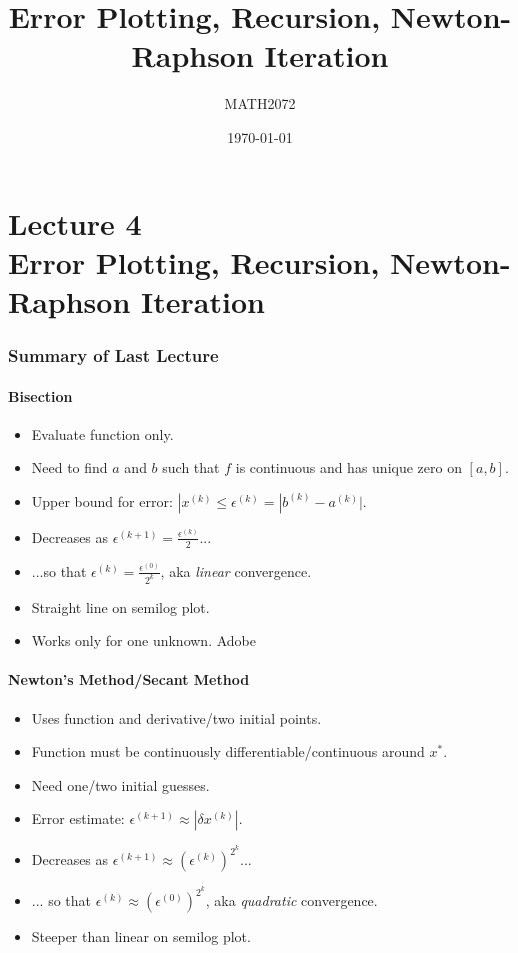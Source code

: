 \documentclass{article}
\title{Error Plotting, Recursion, Newton-Raphson Iteration}
\author{MATH2072}
\date{\today}
\begin{document}
\part*{Lecture 4\\Error Plotting, Recursion, Newton-Raphson Iteration}

\section*{Summary of Last Lecture}

\subsection*{Bisection}
\begin{itemize}
	\item Evaluate function only.
	\item Need to find $a$ and $b$ such that $f$ is continuous and has unique zero on $[a,b]$. 
	\item Upper bound for error: $|x^{(k)} \leq \epsilon^{(k)} = |b^{(k)}-a^{(k)}|$.
	\item Decreases as $\epsilon^{(k+1)}=\frac{\epsilon^{(k)}}{2}$...
	\item ...so that $\epsilon^{(k)}=\frac{\epsilon^{(0)}}{2^k}$, aka \textit{linear} convergence. 
	\item Straight line on semilog plot.
	\item Works only for one unknown. Adobe
\end{itemize}

\subsection*{Newton's Method/Secant Method}
\begin{itemize}
	\item Uses function and derivative/two initial points.
	\item Function must be continuously differentiable/continuous around $x^*$.
	\item Need one/two initial guesses.
	\item Error estimate: $\epsilon^{(k+1)} \approx |\delta x^{(k)}|$.
	\item Decreases as $\epsilon^{(k+1)} \approx (\epsilon^{(k)})^{2^k}$...
	\item ... so that $\epsilon^{(k)} \approx (\epsilon^{(0)})^{2^k}$, aka \textit{quadratic} convergence.
	\item Steeper than linear on semilog plot.  
\end{itemize}
\end{document}
